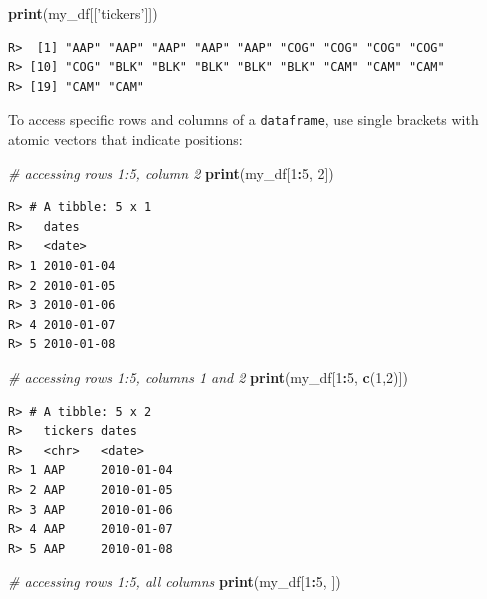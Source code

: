 \documentclass[
  12pt,
]{book}
\newenvironment{Shaded}{\begin{snugshade}}{\end{snugshade}}
\newcommand{\CommentTok}[1]{\textcolor[rgb]{0.37,0.37,0.37}{\textit{#1}}}
\newcommand{\DecValTok}[1]{\textcolor[rgb]{0.06,0.06,0.06}{#1}}
\newcommand{\KeywordTok}[1]{\textcolor[rgb]{0.27,0.27,0.27}{\textbf{#1}}}
\newcommand{\NormalTok}[1]{#1}
\newcommand{\OperatorTok}[1]{\textcolor[rgb]{0.43,0.43,0.43}{\textbf{#1}}}
\newcommand{\StringTok}[1]{\textcolor[rgb]{0.5,0.5,0.5}{#1}}
\begin{document}
\begin{Shaded}
\begin{Highlighting}[]
\KeywordTok{print}\NormalTok{(my_df[[}\StringTok{'tickers'}\NormalTok{]])}
\end{Highlighting}
\end{Shaded}

\begin{verbatim}
R>  [1] "AAP" "AAP" "AAP" "AAP" "AAP" "COG" "COG" "COG" "COG"
R> [10] "COG" "BLK" "BLK" "BLK" "BLK" "BLK" "CAM" "CAM" "CAM"
R> [19] "CAM" "CAM"
\end{verbatim}

To access specific rows and columns of a \texttt{dataframe}, use single brackets with atomic vectors that indicate positions:

\begin{Shaded}
\begin{Highlighting}[]
\CommentTok{# accessing rows 1:5, column 2}
\KeywordTok{print}\NormalTok{(my_df[}\DecValTok{1}\OperatorTok{:}\DecValTok{5}\NormalTok{, }\DecValTok{2}\NormalTok{])}
\end{Highlighting}
\end{Shaded}

\begin{verbatim}
R> # A tibble: 5 x 1
R>   dates     
R>   <date>    
R> 1 2010-01-04
R> 2 2010-01-05
R> 3 2010-01-06
R> 4 2010-01-07
R> 5 2010-01-08
\end{verbatim}

\begin{Shaded}
\begin{Highlighting}[]
\CommentTok{# accessing rows 1:5, columns 1 and 2}
\KeywordTok{print}\NormalTok{(my_df[}\DecValTok{1}\OperatorTok{:}\DecValTok{5}\NormalTok{, }\KeywordTok{c}\NormalTok{(}\DecValTok{1}\NormalTok{,}\DecValTok{2}\NormalTok{)])}
\end{Highlighting}
\end{Shaded}

\begin{verbatim}
R> # A tibble: 5 x 2
R>   tickers dates     
R>   <chr>   <date>    
R> 1 AAP     2010-01-04
R> 2 AAP     2010-01-05
R> 3 AAP     2010-01-06
R> 4 AAP     2010-01-07
R> 5 AAP     2010-01-08
\end{verbatim}

\begin{Shaded}
\begin{Highlighting}[]
\CommentTok{# accessing rows 1:5, all columns}
\KeywordTok{print}\NormalTok{(my_df[}\DecValTok{1}\OperatorTok{:}\DecValTok{5}\NormalTok{, ])}
\end{Highlighting}
\end{Shaded}
\end{document}
